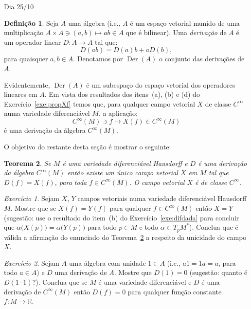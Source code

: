 \documentclass[oneside,11pt]{amsart}
\newcommand{\R}{\mathds R}
\DeclareMathOperator{\Der}{Der}
\theoremstyle{remark}\newtheorem{exercise}{Exercício}[section]
\theoremstyle{plain}\newtheorem{teo}{Teorema}[section]
\theoremstyle{plain}\newtheorem{lem}[teo]{Lema}
\theoremstyle{plain}\newtheorem{prop}[teo]{Proposição}
\theoremstyle{definition}\newtheorem{defin}[teo]{Definição}
\theoremstyle{remark}\newtheorem{rem}[teo]{Observação}
\theoremstyle{definition}\newtheorem{example}[teo]{Exemplo}
\numberwithin{equation}{section}
\begin{document}
\begin{section}{Dia 25/10}
\begin{defin}
Seja $A$ uma álgebra (i.e., $A$ é um espaço vetorial munido de uma multiplicação $A\times A\ni(a,b)\mapsto ab\in A$ que é bilinear). Uma {\em derivação\/}
de $A$ é um operador linear $D:A\to A$ tal que:
\[D(ab)=D(a)b+aD(b),\]
para quaisquer $a,b\in A$. Denotamos por $\Der(A)$ o conjunto das derivações de $A$.
\end{defin}
Evidentemente, $\Der(A)$ é um subespaço do espaço vetorial dos operadores lineares em $A$.
Em vista dos resultados dos itens~(a), (b) e (d) do Exercício~\ref{exe:propXf} temos que, para qualquer campo vetorial $X$ de classe $C^\infty$
numa variedade diferenciável $M$, a aplicação:
\begin{equation}\label{eq:dercampo}
C^\infty(M)\ni f\longmapsto X(f)\in C^\infty(M)
\end{equation}
é uma derivação da álgebra $C^\infty(M)$.

\medskip

O objetivo do restante desta seção é mostrar o seguinte:
\begin{teo}\label{thm:camposderivacoes}
Se $M$ é uma variedade diferenciável Hausdorff e $D$ é uma derivação da álgebra $C^\infty(M)$ então existe um único campo vetorial $X$ em $M$ tal que
$D(f)=X(f)$, para toda $f\in C^\infty(M)$. O campo vetorial $X$ é de classe $C^\infty$.
\end{teo}

\begin{exercise}\label{exe:XfYfXigualY}
Sejam $X$, $Y$ campos vetoriais numa variedade diferenciável Hausdorff $M$. Mostre que se $X(f)=Y(f)$ para qualquer $f\in C^\infty(M)$ então $X=Y$
(sugestão: use o resultado do item~(b) do Exercício~\ref{exe:difdada} para concluir que $\alpha\big(X(p)\big)=\alpha\big(Y(p)\big)$ para todo
$p\in M$ e todo $\alpha\in T_pM^*$). Conclua que é válida a afirmação do enunciado do Teorema~\ref{thm:camposderivacoes} a respeito da unicidade do campo $X$.
\end{exercise}

\begin{exercise}\label{exe:Dconst}
Sejam $A$ uma álgebra com unidade $1\in A$ (i.e., $a1=1a=a$, para todo $a\in A$)
e $D$ uma derivação de $A$. Mostre que $D(1)=0$ (sugestão: quanto é $D(1\cdot1)$?).
Conclua que se $M$ é uma variedade diferenciável e $D$ é uma derivação de $C^\infty(M)$ então $D(f)=0$ para qualquer função constante $f:M\to\R$.
\end{exercise}


\end{section}
\end{document}
